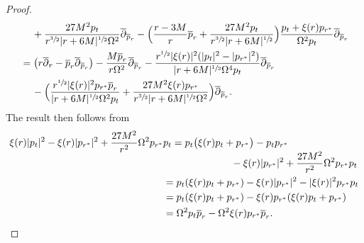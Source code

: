 \documentclass[JEP,XML,SOM,Unicode,published]{cedram}
\theoremstyle{plain}
\theoremstyle{definition}
\begin{document}
\begin{proof}
\begin{align*}
& \quad \, +\frac{27M^2p_t}{r^{\sfrac{3}{2}}|r+6M|^{\sfrac{1}{2}} \Omega^2 } \overline{\partial}_{\overline{p}_r} - \Bigl(\frac{r-3M}{r} \overline{p}_r+ \frac{27M^2 p_t}{r^{\sfrac{3}{2}}|r+6M|^{\sfrac{1}{2}}} \Bigr) \frac{p_t+\xi(r)p_{r^*}}{ \Omega^2p_t}\overline{\partial}_{\overline{p}_r} \\
& =\bigl(r \overline{\partial}_r-\overline{p}_r \overline{\partial}_{\overline{p}_r} \bigr)-\frac{M \overline{p}_r}{r \Omega^2} \overline{\partial}_{\overline{p}_r}-\frac{r^{\sfrac{1}{2}}|\xi(r)|^2(|p_t|^2-|p_{r^*}|^2)}{|r+6M|^{\sfrac{1}{2}}\Omega^4p_t} \overline{\partial}_{\overline{p}_r} \\
& \quad \, - \Bigl(\frac{r^{\sfrac{1}{2}}|\xi (r)|^2p_{r^*} \overline{p}_r}{|r+6M|^{\sfrac{1}{2}}\Omega^2p_t} + \frac{27M^2 \xi(r)p_{r^*} }{r^{\sfrac{3}{2}}|r+6M|^{\sfrac{1}{2}}\Omega^2} \Bigr) \overline{\partial}_{\overline{p}_r}.
\end{align*}
The result then follows from
\begin{align*}
\xi(r)|p_t|^2-\xi (r) |p_{r^*}|^2+\frac{27M^2}{r^2}\Omega^2 p_{r^*}&p_t =p_t \bigl(\xi (r) p_t+p_{r^*} \bigr)-p_tp_{r^*} \\[-5pt]
&\hspace*{2.4cm} -\xi (r) |p_{r^*}|^2+\frac{27M^2}{r^2}\Omega^2 p_{r^*}p_t \\
& =p_t(\xi (r) p_t+p_{r^*})-\xi (r) |p_{r^*}|^2-|\xi(r)|^2 p_{r^*}p_t \\
& =p_t(\xi (r) p_t+p_{r^*})-\xi(r) p_{r^*}(\xi(r)p_t+p_{r^*}) \\
& =\Omega^2 p_t \overline{p}_r-\Omega^2 \xi(r) p_{r^*} \overline{p}_r.\qedhere
\end{align*}
\end{proof}

\backmatter


\end{document}
